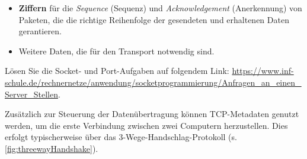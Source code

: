 \begin{itemize}
\begin{table}[H]
\begin{tabular}{ccc}
			      \bottomrule
		      \end{tabular}
		      \caption{Gängige \gls{TCP}-Ports, Anwendungen und deren Verwendung}
		      \label{tab:tcp_ports}
	      \end{table}
	      Sowohl der \textit{Client} wie auch der \textit{Server} versehen die Daten mit jeweils einer Zahl, die für den Ursprungs-Port (\textit{Source Port}), respektive den Ziel-Port (\textit{Destination Port}) stehen.
	\item \textbf{Ziffern} für die \textit{Sequence} (Sequenz) und \textit{Acknowledgement} (Anerkennung) von Paketen, die die richtige Reihenfolge der gesendeten und erhaltenen Daten gerantieren.
	\item Weitere Daten, die für den Transport notwendig sind.
\end{itemize}

\begin{mychallenge}
	Lösen Sie die Socket- und Port-Aufgaben auf folgendem Link: \url{https://www.inf-schule.de/rechnernetze/anwendung/socketprogrammierung/Anfragen_an_einen_Server_Stellen}.
\end{mychallenge}

Zusätzlich zur Steuerung der Datenübertragung können \gls{TCP}-Metadaten genutzt werden, um die erste Verbindung zwischen zwei Computern herzustellen. Dies erfolgt typischerweise über das 3-Wege-Handschlag-Protokoll (s. \cref{fig:threewayHandshake}).

